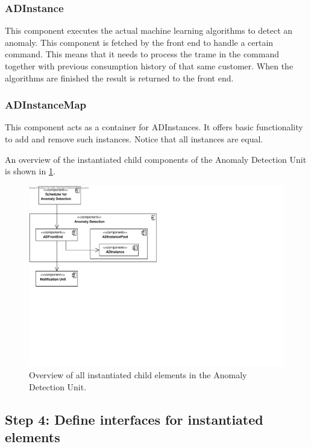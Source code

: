 \subsubsection{ADInstance}

\npar This component executes the actual machine learning algorithms to detect
an anomaly. This component is fetched by the front end to handle a certain
command. This means that it needs to process the trame in the command together
with previous consumption history of that same customer. When the algorithms are
finished the result is returned to the front end.

\subsubsection{ADInstanceMap}

\npar This component acts as a container for ADInstances. It offers basic
functionality to add and remove such instances. Notice that all instances
are equal.

\npar An overview of the instantiated child components of the Anomaly Detection
Unit is shown in \ref{fig:it6/elements}.

\begin{figure}[H]
	\begin{centering}
		\includegraphics[width=\textwidth]{figs/add-it6-elements.pdf}
		\caption{Overview of all instantiated child elements in the Anomaly
		Detection Unit.}
		\label{fig:it6/elements}
	\end{centering}
\end{figure}

\subsection{Step 4: Define interfaces for instantiated elements}
\label{add:it6/interfaces}

